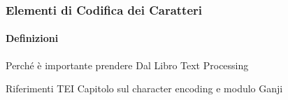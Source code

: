 \begin{frame}
    \frametitle{Elementi di Codifica dei Caratteri}
    \framesubtitle{Definizioni}
    \addtocounter{nframe}{1}
    
    \begin{block}{Perché è importante}
        prendere Dal Libro Text Processing 
    \end{block}

    \begin{block}{Riferimenti TEI}
        Capitolo sul character encoding e modulo Ganji 
    \end{block}

\end{frame}